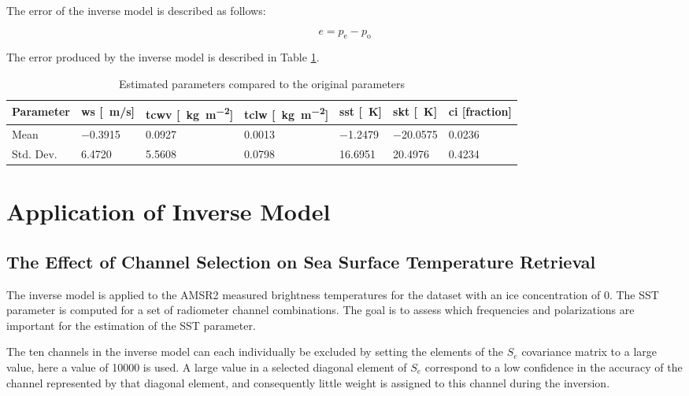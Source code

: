 \documentclass[11pt, a4paper]{article}
\begin{document}
The error of the inverse model is described as follows:

\begin{equation*}
e = p_\text{e} - p_\text{o}
\end{equation*}

The error produced by the inverse model is described in Table \ref{tab:errorinv}.

\begin{table}[h!]
\centering
\begin{tabular}{@{} l l l l l l l @{}}
Parameter & ws [\SI{}{m/s}] & tcwv [\SI{}{\kilo\gram\per\square\meter}] & tclw [\SI{}{\kilo\gram\per\square\meter}] & sst [\SI{}{K}] & skt [\SI{}{K}] & ci [fraction] \\
\midrule
Mean & \SI{-0.3915}{} & \SI{0.0927}{} & \SI{0.0013}{} & \SI{-1.2479}{} & \SI{-20.0575}{} & \SI{0.0236}{} \\
Std. Dev. & \SI{6.4720}{} & \SI{5.5608}{} & \SI{0.0798}{} & \SI{16.6951}{} & \SI{20.4976}{} & \SI{0.4234}{} \\
\midrule
\end{tabular}
\caption{Estimated parameters compared to the original parameters}
\label{tab:errorinv}
\end{table}

\section{Application of Inverse Model}

\subsection{The Effect of Channel Selection on Sea Surface Temperature Retrieval}
The inverse model is applied to the AMSR2 measured brightness temperatures for the dataset with an ice concentration of 0. The SST parameter is computed for a set of radiometer channel combinations. The goal is to assess which frequencies and polarizations are important for the estimation of the SST parameter.
\newline

The ten channels in the inverse model can each individually be excluded by setting the elements of the \(S_e\) covariance matrix to a large value, here  a value of 10000 is used. A large value in a selected diagonal element of \(S_e\) correspond to a low confidence in the accuracy of the channel represented by that diagonal element, and consequently little weight is assigned to this channel during the inversion. 
\newline
\end{document}
